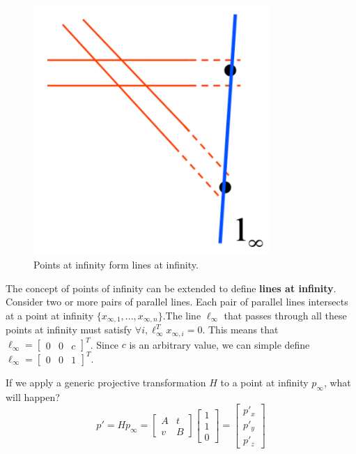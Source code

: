 \documentclass[a4paper, 12pt]{article}
\renewcommand\emph{\textbf}
\begin{document}
\begin{figure}[h!]
\centering
\includegraphics[width=0.8\textwidth]{figures/line_infinity.png}
\caption{Points at infinity form lines at infinity.}
\label{fig:line_infinity}
\end{figure}

The concept of points of infinity can be extended to define \emph{lines at infinity}. Consider two or more pairs of parallel lines. Each pair of parallel lines intersects at a point at infinity $\{x_{\infty,1},...,x_{\infty,n}\}$.The line $\ell_\infty$ that passes through all these points at infinity must satisfy $\forall i, \ell_\infty^T x_{\infty,i}= 0$. This means that $\ell_\infty = \begin{bmatrix}0 & 0 & c\end{bmatrix}^T$. Since $c$ is an arbitrary value, we can simple define $\ell_\infty = \begin{bmatrix}0 & 0 & 1\end{bmatrix}^T$.

If we apply a generic projective transformation $H$ to a point at infinity $p_\infty$, what will happen? 
\begin{equation}
p' =Hp_\infty = \begin{bmatrix} A &t \\ v&B \end{bmatrix}\begin{bmatrix}1\\1\\0\end{bmatrix} = \begin{bmatrix}p'_x\\ p'_y\\p'_z\end{bmatrix}
\end{equation}
\end{document}
